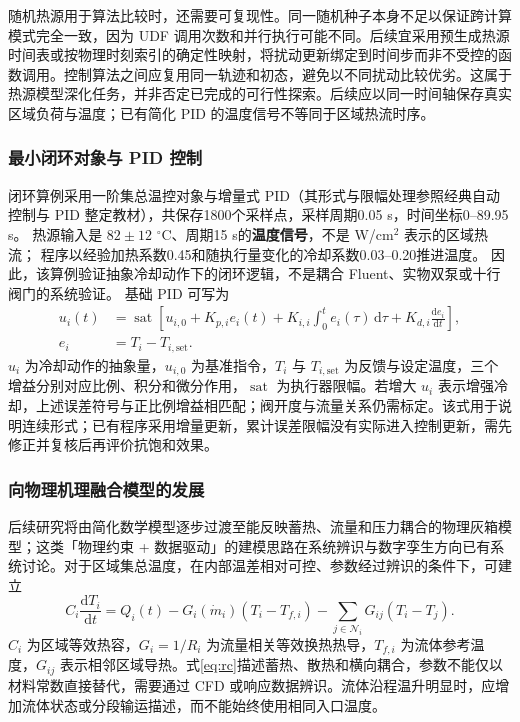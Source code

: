 \documentclass[UTF8]{midterm}
\begin{document}
随机热源用于算法比较时，还需要可复现性。同一随机种子本身不足以保证跨计算模式完全一致，因为 UDF 调用次数和并行执行可能不同。后续宜采用预生成热源时间表或按物理时刻索引的确定性映射，将扰动更新绑定到时间步而非不受控的函数调用。控制算法之间应复用同一轨迹和初态，避免以不同扰动比较优劣。这属于热源模型深化任务，并非否定已完成的可行性探索。后续应以同一时间轴保存真实区域负荷与温度；已有简化 PID 的温度信号不等同于区域热流时序。


\subsubsection{最小闭环对象与 PID 控制}

闭环算例采用一阶集总温控对象与增量式 PID（其形式与限幅处理参照经典自动控制与 PID 整定教材\cite{hushousong,astrom,ogata}），共保存1800个采样点，采样周期0.05 s，时间坐标0--89.95 s。
热源输入是 $82\pm12$ $^\circ$C、周期15 s的\textbf{温度信号}，不是 W/cm$^2$ 表示的区域热流；
程序以经验加热系数0.45和随执行量变化的冷却系数0.03--0.20推进温度。
因此，该算例验证抽象冷却动作下的闭环逻辑，不是耦合 Fluent、实物双泵或十行阀门的系统验证。
基础 PID 可写为
\begin{equation}\begin{aligned}
u_i(t)&=\operatorname{sat}\left[u_{i,0}+K_{p,i}e_i(t)+K_{i,i}\int_0^t e_i(\tau)\,\mathrm d\tau+K_{d,i}\frac{\mathrm de_i}{\mathrm dt}\right],\\
e_i&=T_i-T_{i,\mathrm{set}}.
\end{aligned}\label{eq:pid}
\end{equation}
$u_i$ 为冷却动作的抽象量，$u_{i,0}$ 为基准指令，$T_i$ 与 $T_{i,\mathrm{set}}$ 为反馈与设定温度，三个增益分别对应比例、积分和微分作用，$\operatorname{sat}$ 为执行器限幅。若增大 $u_i$ 表示增强冷却，上述误差符号与正比例增益相匹配；阀开度与流量关系仍需标定。该式用于说明连续形式；已有程序采用增量更新，累计误差限幅没有实际进入控制更新，需先修正并复核后再评价抗饱和效果。

\subsubsection{向物理机理融合模型的发展}
后续研究将由简化数学模型逐步过渡至能反映蓄热、流量和压力耦合的物理灰箱模型；这类「物理约束 + 数据驱动」的建模思路在系统辨识与数字孪生方向已有系统讨论\cite{brunton,tao}。对于区域集总温度，在内部温差相对可控、参数经过辨识的条件下，可建立
\begin{equation}
C_i\frac{\mathrm dT_i}{\mathrm dt}=Q_i(t)-G_i(\dot m_i)(T_i-T_{f,i})
-\sum_{j\in\mathcal N_i}G_{ij}(T_i-T_j).\label{eq:rc}
\end{equation}
$C_i$ 为区域等效热容，$G_i=1/R_i$ 为流量相关等效换热热导，$T_{f,i}$ 为流体参考温度，$G_{ij}$ 表示相邻区域导热。式\eqref{eq:rc}描述蓄热、散热和横向耦合，参数不能仅以材料常数直接替代，需要通过 CFD 或响应数据辨识。流体沿程温升明显时，应增加流体状态或分段输运描述，而不能始终使用相同入口温度。
\end{document}
